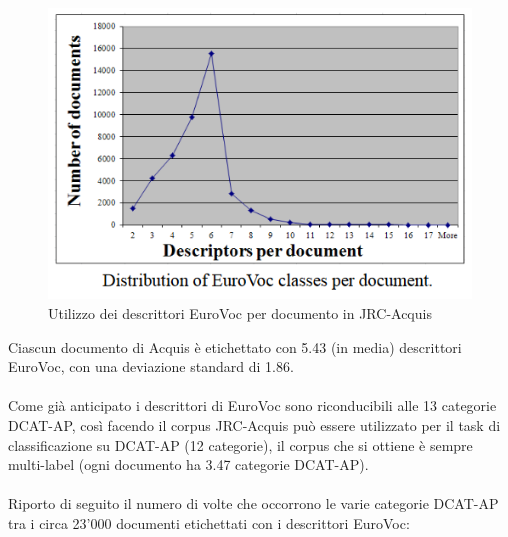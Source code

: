 \documentclass{article}
\theoremstyle{plain}
\theoremstyle{definition}
\begin{document}
\begin{figure}[htbp]
\begin{center}
\includegraphics[scale=1.00]{img/evocdistribution.png}
\caption{Utilizzo dei descrittori EuroVoc per documento in JRC-Acquis}
\end{center}
\end{figure}
Ciascun documento di Acquis è etichettato con 5.43 (in media) descrittori EuroVoc, con una deviazione standard di 1.86.
\footnotemark
{}
\\
\\
Come già anticipato i descrittori di EuroVoc sono riconducibili alle 13 categorie DCAT-AP, così facendo il corpus JRC-Acquis può essere utilizzato per il task di classificazione su DCAT-AP (12 categorie), il corpus che si ottiene è sempre multi-label (ogni documento ha 3.47 categorie DCAT-AP).
\\
\\
Riporto di seguito il numero di volte che occorrono le varie categorie DCAT-AP tra i circa 23'000 documenti etichettati con i descrittori EuroVoc:
\end{document}
